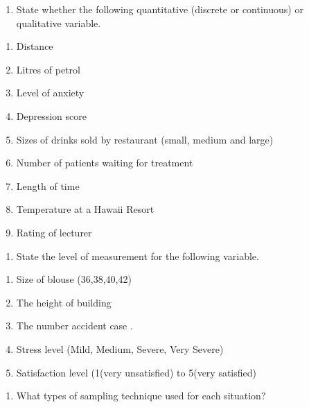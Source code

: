 \documentclass[
  a4paper,
  DIV=11,
  numbers=noendperiod,
  oneside]{scrreprt}
\providecommand{\tightlist}{%
  \setlength{\itemsep}{0pt}\setlength{\parskip}{0pt}}\usepackage{longtable,booktabs,array}
\begin{document}
\begin{enumerate}
\def\labelenumi{\arabic{enumi}.}
\setcounter{enumi}{5}
\tightlist
\item
  State whether the following quantitative (discrete or continuous) or
  qualitative variable.
\end{enumerate}

\begin{enumerate}
\def\labelenumi{\alph{enumi})}
\tightlist
\item
  Distance
\item
  Litres of petrol
\item
  Level of anxiety
\item
  Depression score
\item
  Sizes of drinks sold by restaurant (small, medium and large)
\item
  Number of patients waiting for treatment
\item
  Length of time
\item
  Temperature at a Hawaii Resort
\item
  Rating of lecturer
\end{enumerate}

\begin{enumerate}
\def\labelenumi{\arabic{enumi}.}
\setcounter{enumi}{6}
\tightlist
\item
  State the level of measurement for the following variable.
\end{enumerate}

\begin{enumerate}
\def\labelenumi{\alph{enumi})}
\tightlist
\item
  Size of blouse (36,38,40,42)
\item
  The height of building
\item
  The number accident case .
\item
  Stress level (Mild, Medium, Severe, Very Severe)
\item
  Satisfaction level (1(very unsatisfied) to 5(very satisfied)
\end{enumerate}

\begin{enumerate}
\def\labelenumi{\arabic{enumi}.}
\setcounter{enumi}{7}
\tightlist
\item
  What types of sampling technique used for each situation?
\end{enumerate}
\end{document}
